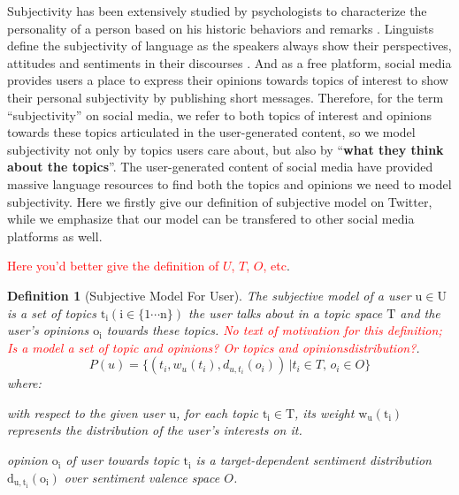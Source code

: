 \documentclass{acm_proc_article-sp}
\newtheorem{definition}{Definition}
\newcommand{\mo}[1]{\textcolor{red}{#1}}
\begin{document}
Subjectivity has been extensively studied by psychologists to characterize the personality of a person based on his historic behaviors and remarks \cite{Engbert2007}. 
Linguists define the subjectivity of language as the speakers always show their perspectives, attitudes and sentiments in their discourses \cite{stein2005subjectivity}.
And as a free platform, social media provides users a place to express their opinions towards topics of interest to show their personal subjectivity by publishing short messages. 
Therefore, for the term ``subjectivity'' on social media, we refer to both topics of interest and opinions towards these topics articulated in the user-generated content, so we model subjectivity not only by topics users care about, but also by ``\textbf{what they think about the topics}''.
The user-generated content of social media have provided massive language resources to find both the topics and opinions we need to model subjectivity. 
Here we firstly give our definition of subjective model on Twitter, while we emphasize that our model can be transfered to other social media platforms as well.

\mo{Here you'd better give the definition of $U$, $T$, $O$, etc}. 

\begin{definition}[Subjective Model For User]
The subjective model of a user $\mathrm{u \in U}$ is a set of topics $\mathrm{t_{i} \left( i \in \lbrace1 \cdots n \rbrace \right) }$ 
the user talks about in a topic space $\mathrm{T}$ and the user's opinions $\mathrm{o_{i}}$ towards these topics. \mo{No text of motivation for this definition; Is a model a set of topic and opinions? Or topics and opinionsdistribution?}. 
\begin{equation}
\label{usermodel}
P \left( u \right) = \lbrace \left( t_{i}, w_{u} \left( t_{i} \right), d_{u,t_{i}} \left( o_{i} \right) \right) \,\vert  t_{i} \in T, \, o_{i} \in O \rbrace
\end{equation}
where:
\begin{itemize*}
\item with respect to the given user $\mathrm{u}$,  for each topic $\mathrm{t_{i} \in T}$, its  weight $\mathrm{ w_{u} \left( t_{i} \right)}$ represents the distribution of the user's interests on it.
\item opinion $\mathrm{o_{i}}$ of user towards topic $\mathrm{t_{i}}$ is a target-dependent sentiment distribution  $\mathrm{d_{u,t_{i}} \left( o_{i} \right)}$ over sentiment valence space $O$.
\end{itemize*}
\end{definition}
\end{document}
